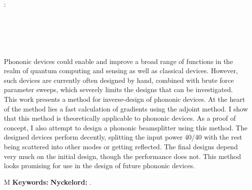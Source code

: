 \thesisImprintTitle:\\
\thesisImprintSubtitle\\[1ex]
\thesisAuthor\\
\thesisDepartment\\
\thesisUniversity

\thispagestyle{plain}           %
\section*{\abstractname}
Phononic devices could enable and improve a broad range of functions in
the realm of quantum computing and sensing as well as classical devices.
However, such devices are currently often designed by hand, combined with brute force
parameter sweeps, which severely limits the designs that can be investigated.
This work presents a method for inverse-design of phononic devices.
At the heart of the method lies a fast calculation of gradients using the
adjoint method.
I show that this method is theoretically applicable to phononic devices.
As a proof of concept, I also attempt to design a phononic beamsplitter using
this method.
The designed devices perform decently, splitting the input power 40/40 with the rest
being scattered into other modes or getting reflected.
The final designs depend very much on the initial design,
though the performance does not.
This method looks promising for use in the design of future phononic devices.

\if\thesisType M
    \textbf{Keywords:}
\else
    \textbf{Nyckelord:}
\fi
\thesisKeywords.

\if{}
\newpage                %
\thispagestyle{empty}
\mbox{}
\fi
